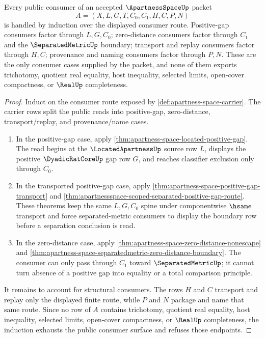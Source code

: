 \begin{theorem}
\label{thm:apartness-space-mature-route}
Every public consumer of an accepted $\ApartnessSpaceUp$ packet
$$
A=(X,L,G,T,C_0,C_1,H,C,P,N)
$$
is handled by induction over the displayed consumer route. Positive-gap
consumers factor through $L,G,C_0$; zero-distance consumers factor through
$C_1$ and the $\SeparatedMetricUp$ boundary; transport and replay consumers
factor through $H,C$; provenance and naming consumers factor through $P,N$.
These are the only consumer cases supplied by the packet, and none of them
exports trichotomy, quotient real equality, host inequality, selected limits,
open-cover compactness, or $\RealUp$ completeness.
\end{theorem}
\begin{proof}
Induct on the consumer route exposed by
\autoref{def:apartness-space-carrier}. The carrier rows split the public
reads into positive-gap, zero-distance, transport/replay, and
provenance/name cases.

\begin{enumerate}
\item In the positive-gap case, apply
\autoref{thm:apartness-space-located-positive-gap}. The read begins at the
$\LocatedApartnessUp$ source row $L$, displays the positive
$\DyadicRatCoreUp$ gap row $G$, and reaches classifier exclusion only through
$C_0$.

\item In the transported positive-gap case, apply
\autoref{thm:apartness-space-positive-gap-transport} and
\autoref{thm:apartnessspace-scoped-separated-positive-gap-route}. These
theorems keep the same $L,G,C_0$ spine under componentwise $\hsame$
transport and force separated-metric consumers to display the boundary row
before a separation conclusion is read.

\item In the zero-distance case, apply
\autoref{thm:apartness-space-zero-distance-nonescape} and
\autoref{thm:apartness-space-separatedmetric-zero-distance-boundary}. The
consumer can only pass through $C_1$ toward $\SeparatedMetricUp$; it cannot
turn absence of a positive gap into equality or a total comparison principle.
\end{enumerate}

It remains to account for structural consumers. The rows $H$ and $C$ transport
and replay only the displayed finite route, while $P$ and $N$ package and name
that same route. Since no row of $A$ contains trichotomy, quotient real
equality, host inequality, selected limits, open-cover compactness, or
$\RealUp$ completeness, the induction exhausts the public consumer surface and
refuses those endpoints.
\end{proof}

